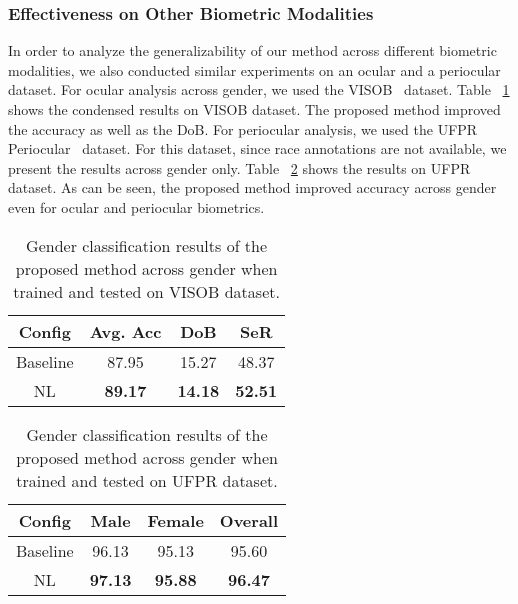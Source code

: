 \documentclass[runningheads]{llncs}
\begin{document}
\subsubsection{\textbf{Effectiveness on Other Biometric Modalities}} In order to analyze the generalizability of our method across different biometric modalities, we also conducted similar experiments on an ocular and a periocular dataset. For ocular analysis across gender, we used the VISOB~\cite{visob} dataset. Table ~\ref{tab:results_visob} shows the condensed results on VISOB dataset. The proposed method improved the accuracy as well as the DoB. For periocular analysis, we used the UFPR Periocular~\cite{ufpr} dataset. For this dataset, since race annotations are not available, we present the results across gender only. Table ~\ref{tab:results_ufpr} shows the results on UFPR dataset. As can be seen, the proposed method improved accuracy across gender even for ocular and periocular biometrics. 

\begin{table}[H]
    \centering
    \caption{Gender classification results of the proposed method across gender when trained and tested on VISOB dataset.}
    \label{tab:results_visob}
    \begin{tabular}{cccc} 
    \toprule
    \textbf{Config} & \textbf{Avg. Acc } & \textbf{DoB } & \textbf{SeR } \\ \midrule
    Baseline &  87.95 & 15.27 & 48.37 \\
    NL & \textbf{89.17} & \textbf{14.18} & \textbf{52.51} \\
    \bottomrule
    \end{tabular}
\end{table}

\begin{table}[H]
    \centering
    \caption{Gender classification results of the proposed method across gender when trained and tested on UFPR dataset.}
    \label{tab:results_ufpr}
    \begin{tabular}{cccc} 
    \toprule
    \textbf{Config} & \textbf{Male } & \textbf{Female } & \textbf{Overall } \\ \midrule
    Baseline & 96.13 & 95.13 & 95.60 \\
    NL & \textbf{97.13} & \textbf{95.88} & \textbf{96.47} \\
    \bottomrule
    \end{tabular}
\end{table}
\end{document}
